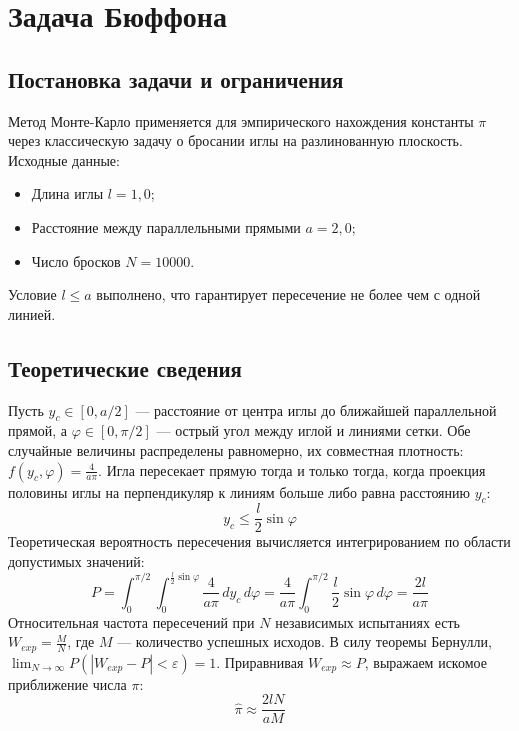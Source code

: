 \documentclass[a4paper,14pt]{extarticle}
\begin{document}
\section{Задача Бюффона}

\subsection{Постановка задачи и ограничения}
Метод Монте-Карло применяется для эмпирического нахождения константы $\pi$ через классическую задачу о бросании иглы на разлинованную плоскость. Исходные данные:
\begin{itemize}
    \item Длина иглы $l = 1,0$;
    \item Расстояние между параллельными прямыми $a = 2,0$;
    \item Число бросков $N = 10000$.
\end{itemize}
Условие $l \leq a$ выполнено, что гарантирует пересечение не более чем с одной линией.

\subsection{Теоретические сведения}
Пусть $y_c \in [0, a/2]$ — расстояние от центра иглы до ближайшей параллельной прямой, а $\varphi \in [0, \pi/2]$ — острый угол между иглой и линиями сетки. Обе случайные величины распределены равномерно, их совместная плотность: $f(y_c, \varphi) = \frac{4}{a\pi}$.
Игла пересекает прямую тогда и только тогда, когда проекция половины иглы на перпендикуляр к линиям больше либо равна расстоянию $y_c$:
\begin{equation}
    y_c \leq \frac{l}{2} \sin \varphi
\end{equation}
Теоретическая вероятность пересечения вычисляется интегрированием по области допустимых значений:
\begin{equation}
    P = \int_{0}^{\pi/2} \int_{0}^{\frac{l}{2} \sin \varphi} \frac{4}{a\pi} \,dy_c\,d\varphi = \frac{4}{a\pi} \int_{0}^{\pi/2} \frac{l}{2} \sin \varphi \,d\varphi = \frac{2l}{a\pi}
\end{equation}
Относительная частота пересечений при $N$ независимых испытаниях есть $W_{exp} = \frac{M}{N}$, где $M$ — количество успешных исходов. В силу теоремы Бернулли, $\lim_{N \to \infty} P(|W_{exp} - P| < \varepsilon) = 1$. Приравнивая $W_{exp} \approx P$, выражаем искомое приближение числа $\pi$:
\begin{equation}
    \hat{\pi} \approx \frac{2lN}{aM}
\end{equation}
\end{document}

